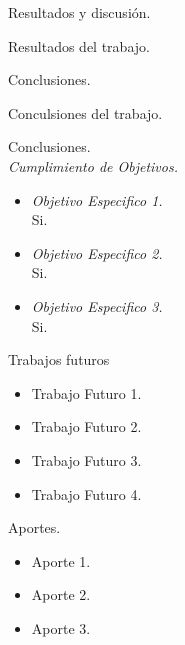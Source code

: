 \begin{frame}[t]{Resultados y discusión.}
    \begin{center}
        Resultados del trabajo.
    \end{center}
\end{frame}

\begin{frame}[t]{Conclusiones.}
    \begin{center}
        Conculsiones del trabajo.
    \end{center}
\end{frame}


\begin{frame}[t]{Conclusiones.\\\textit{Cumplimiento de Objetivos.}}
    \begin{center}
        \begin{itemize}
        \item \textit{Objetivo Especifico 1.}
        \pause
        \\Si.
        \pause
        \item \textit{Objetivo Especifico 2.}
        \pause
        \\Si.

        \item \textit{Objetivo Especifico 3.}
        \pause
        \\Si.
        \end{itemize}
    \end{center}
\end{frame}

\begin{frame}[t]{Trabajos futuros}
    \begin{center}
        \begin{itemize}
            \item Trabajo Futuro 1.
            \item Trabajo Futuro 2.
            \item Trabajo Futuro 3.
            \item Trabajo Futuro 4.
        \end{itemize}
    \end{center}
\end{frame}

\begin{frame}[c]{Aportes.}
    \begin{itemize}
        \item Aporte 1.
        \item Aporte 2.
        \item Aporte 3.
    \end{itemize}
\end{frame}


